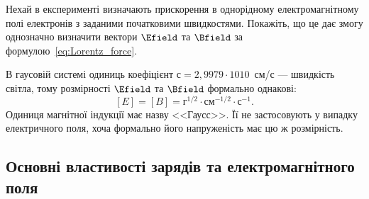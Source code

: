 \begin{problem}\label{prb:1}%
Нехай в експерименті визначають прискорення в однорідному
електромагнітному полі електронів з заданими початковими швидкостями.
Покажіть, що це дає змогу однозначно визначити вектори $\Efield$
та $\Bfield$ за формулою~\eqref{eq:Lorentz_force}.
\end{problem}

В гаусовій системі одиниць коефіцієнт $с = 2,9979⋅1010$~см/с --- швидкість
світла, тому розмірності $\Efield$
та $\Bfield$ формально однакові:
\begin{equation*}
    \left[ E\right]  = \left[ B \right]  = \text{г}^{1/2}\cdot\text{см}^{-1/2}\cdot\text{с}^{-1}.
\end{equation*}
Одиниця магнітної індукції має назву <<Гаусс>>. Її не застосовують у випадку
електричного поля, хоча формально його напруженість має цю ж розмірність.


\subsection*{Основні властивості зарядів та електромагнітного поля}


